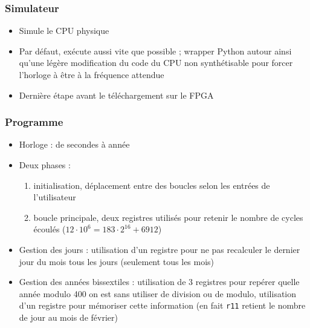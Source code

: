 \documentclass{beamer}
\begin{document}
\begin{frame}
    \frametitle{Simulateur}
    \begin{itemize}
        \item Simule le CPU physique
        \item Par défaut, exécute aussi vite que possible ; wrapper Python autour ainsi qu'une légère modification du code du CPU non synthétisable pour forcer l'horloge à être à la fréquence attendue
        \item Dernière étape avant le téléchargement sur le FPGA
    \end{itemize}
\end{frame}

\begin{frame}[fragile]
    \frametitle{Programme}
    \begin{itemize}
        \item Horloge : de secondes à année
        \item Deux phases :
            \begin{enumerate}
            \item initialisation, déplacement entre des boucles selon les entrées de l'utilisateur
            \item boucle principale, deux registres utilisés pour retenir le nombre de cycles écoulés ($12 \cdot 10^6 = 183 \cdot 2^16 + 6912$)
            \end{enumerate}

        \item Gestion des jours : utilisation d'un registre pour ne pas recalculer le dernier jour du mois tous les jours (seulement tous les mois)
        \item Gestion des années bissextiles : utilisation de 3 registres pour repérer quelle année modulo 400 on est sans utiliser de division ou de modulo, utilisation d'un registre pour mémoriser cette information (en fait \verb+r11+ retient le nombre de jour au mois de février)
    \end{itemize}
\end{frame}
\end{document}
